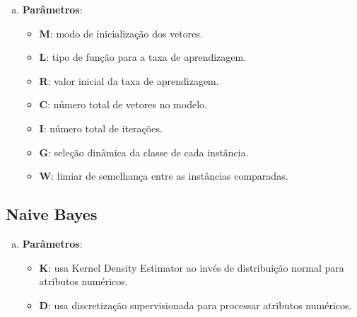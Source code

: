 \begin{enumerate}[a)]
    \item \textbf{Parâmetros}:
        \begin{itemize}

            \item \textbf{M}: modo de inicialização dos vetores.

            \item \textbf{L}: tipo de função para a taxa de aprendizagem.

            \item \textbf{R}: valor inicial da taxa de aprendizagem.

            \item \textbf{C}: número total de vetores no modelo.

            \item \textbf{I}: número total de iterações.

            \item \textbf{G}: seleção dinâmica da classe de cada instância.

            \item \textbf{W}: limiar de semelhança entre as instâncias comparadas.
        \end{itemize}
\end{enumerate}

\subsection{Naive Bayes}

\begin{enumerate}[a)]
    \item \textbf{Parâmetros}:
        \begin{itemize}

            \item \textbf{K}: usa Kernel Density Estimator ao invés de distribuição normal para atributos numéricos.

            \item \textbf{D}: usa discretização supervisionada para processar atributos numéricos.
        \end{itemize}
\end{enumerate}


